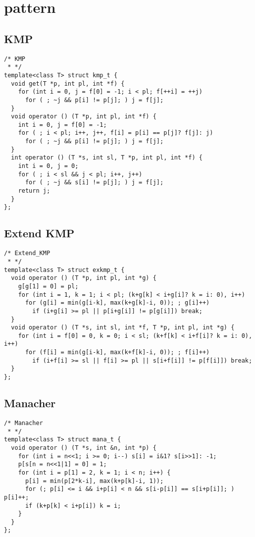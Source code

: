 
\section{pattern}

\subsection{KMP}
\begin{lstlisting}
/* KMP
 * */
template<class T> struct kmp_t {
  void get(T *p, int pl, int *f) {
    for (int i = 0, j = f[0] = -1; i < pl; f[++i] = ++j)
      for ( ; ~j && p[i] != p[j]; ) j = f[j];
  }
  void operator () (T *p, int pl, int *f) {
    int i = 0, j = f[0] = -1;
    for ( ; i < pl; i++, j++, f[i] = p[i] == p[j]? f[j]: j)
      for ( ; ~j && p[i] != p[j]; ) j = f[j];
  }
  int operator () (T *s, int sl, T *p, int pl, int *f) {
    int i = 0, j = 0;
    for ( ; i < sl && j < pl; i++, j++)
      for ( ; ~j && s[i] != p[j]; ) j = f[j];
    return j;
  }
};
\end{lstlisting}


\subsection{Extend KMP}
\begin{lstlisting}
/* Extend_KMP
 * */
template<class T> struct exkmp_t {
  void operator () (T *p, int pl, int *g) {
    g[g[1] = 0] = pl;
    for (int i = 1, k = 1; i < pl; (k+g[k] < i+g[i]? k = i: 0), i++)
      for (g[i] = min(g[i-k], max(k+g[k]-i, 0)); ; g[i]++)
        if (i+g[i] >= pl || p[i+g[i]] != p[g[i]]) break;
  }
  void operator () (T *s, int sl, int *f, T *p, int pl, int *g) {
    for (int i = f[0] = 0, k = 0; i < sl; (k+f[k] < i+f[i]? k = i: 0), i++)
      for (f[i] = min(g[i-k], max(k+f[k]-i, 0)); ; f[i]++)
        if (i+f[i] >= sl || f[i] >= pl || s[i+f[i]] != p[f[i]]) break;
  }
};
\end{lstlisting}


\subsection{Manacher}
\begin{lstlisting}
/* Manacher
 * */
template<class T> struct mana_t {
  void operator () (T *s, int &n, int *p) {
    for (int i = n<<1; i >= 0; i--) s[i] = i&1? s[i>>1]: -1;
    p[s[n = n<<1|1] = 0] = 1;
    for (int i = p[1] = 2, k = 1; i < n; i++) {
      p[i] = min(p[2*k-i], max(k+p[k]-i, 1));
      for (; p[i] <= i && i+p[i] < n && s[i-p[i]] == s[i+p[i]]; ) p[i]++;
      if (k+p[k] < i+p[i]) k = i;
    }
  }
};
\end{lstlisting}


